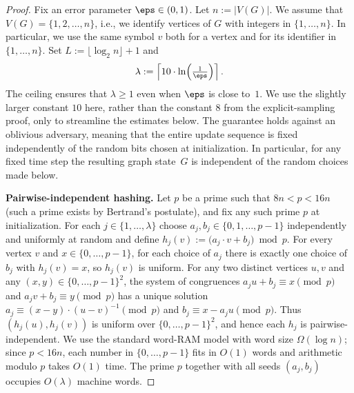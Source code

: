 \begin{proof}
Fix an error parameter $\eps\in(0,1)$.
Let $n := |V(G)|$.
We assume that $V(G)=\{1,2,\dots,n\}$, i.e., we identify vertices of $G$ with
integers in $\{1,\dots,n\}$.
In particular, we use the same symbol $v$ both for a vertex and for its
identifier in $\{1,\dots,n\}$.
Set $L := \lfloor \log_2 n\rfloor + 1$ and
\[
\lambda
:= \left\lceil 10 \cdot
\ln\!\left(\tfrac{1}{\eps}\right)\right\rceil.
\]
The ceiling ensures that $\lambda\ge 1$ even when $\eps$ is close to~$1$.
We use the slightly larger constant $10$ here, rather than the constant $8$
from the explicit-sampling proof, only to streamline the estimates below.
The guarantee holds against an oblivious adversary, meaning that the entire
update sequence is fixed independently of the random bits chosen at
initialization.
In particular, for any fixed time step the resulting graph state~$G$ is
independent of the random choices made below.

\smallskip
\noindent\textbf{Pairwise-independent hashing.}
Let $p$ be a prime such that $8n < p < 16n$
(such a prime exists by Bertrand's postulate),
and fix any such prime $p$ at initialization.
For each $j\in\{1,\dots,\lambda\}$ choose $a_j,b_j\in\{0,1,\dots,p-1\}$
independently and uniformly at random and define
$h_j(v) := \bigl(a_j\cdot v+b_j\bigr)\bmod p$.
For every vertex $v$ and $x\in\{0,\dots,p-1\}$, for each choice of $a_j$ there
is exactly one choice of $b_j$ with $h_j(v)=x$, so $h_j(v)$ is uniform.
For any two distinct vertices $u,v$ and any $(x,y)\in\{0,\dots,p-1\}^2$, the
system of congruences $a_j u+b_j\equiv x\pmod p$ and
$a_j v+b_j\equiv y\pmod p$ has a unique solution
$a_j\equiv (x-y)\cdot (u-v)^{-1}\pmod p$ and $b_j\equiv x-a_j u\pmod p$.
Thus $(h_j(u),h_j(v))$ is uniform over $\{0,\dots,p-1\}^2$, and hence each $h_j$
is pairwise-independent.
We use the standard word-RAM model with word size $\Omega(\log n)$; since
$p<16n$, each number in $\{0,\dots,p-1\}$ fits in $O(1)$ words and arithmetic
modulo $p$ takes $O(1)$ time.
The prime $p$ together with all seeds $(a_j,b_j)$ occupies $O(\lambda)$
machine words.


\end{proof}
